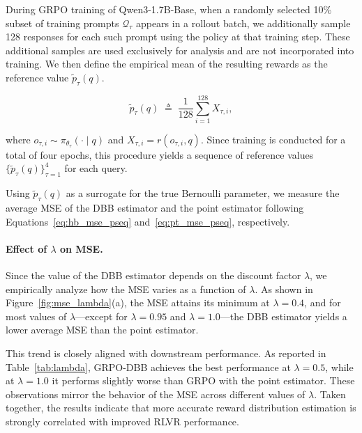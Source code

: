 During GRPO training of Qwen3-1.7B-Base, when a randomly selected 10\% subset of training prompts $\mathcal{Q}_{\tau}$ appears in a rollout batch, we additionally sample 128 responses for each such prompt using the policy at that training step.
These additional samples are used exclusively for analysis and are not incorporated into training.
We then define the empirical mean of the resulting rewards as the reference value $\tilde{p}_{\tau}(q)$.


\vspace{-0.7em}
\begin{equation}
\tilde{p}_{\tau}(q)
\;\triangleq\;
\frac{1}{128}
\sum_{i=1}^{128}
X_{\tau,i},
\label{eq:ptilde}
\end{equation}
\vspace{-0.7em}

\noindent
where
\(
o_{\tau,i} \sim \pi_{\theta_\tau}(\cdot \mid q)
\)
and
\(
X_{\tau,i} = r(o_{\tau,i}, q).
\)
Since training is conducted for a total of four epochs, this procedure yields a sequence of reference values $\{\tilde{p}_{\tau}(q)\}_{\tau=1}^{4}$ for each query.

Using $\tilde{p}_{\tau}(q)$ as a surrogate for the true Bernoulli parameter, we measure the average MSE of the DBB estimator and the point estimator following Equations~\eqref{eq:hb_mse_pseq} and~\eqref{eq:pt_mse_pseq}, respectively.


\paragraph{Effect of $\lambda$ on MSE.}
\label{subsec:anal_lambda}
Since the value of the DBB estimator depends on the discount factor $\lambda$, we empirically analyze how the MSE varies as a function of $\lambda$.
As shown in Figure~\ref{fig:mse_lambda}(a), the MSE attains its minimum at $\lambda = 0.4$, and for most values of $\lambda$—except for $\lambda = 0.95$ and $\lambda = 1.0$—the DBB estimator yields a lower average MSE than the point estimator.

This trend is closely aligned with downstream performance.
As reported in Table~\ref{tab:lambda}, GRPO-DBB achieves the best performance at $\lambda = 0.5$, while at $\lambda = 1.0$ it performs slightly worse than GRPO with the point estimator.
These observations mirror the behavior of the MSE across different values of $\lambda$.
Taken together, the results indicate that more accurate reward distribution estimation is strongly correlated with improved RLVR performance.

